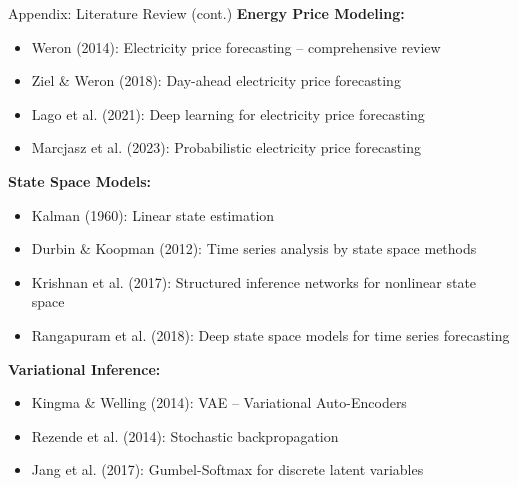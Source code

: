 \documentclass[aspectratio=169]{beamer}
\begin{document}
\begin{frame}{Appendix: Literature Review (cont.)}
\textbf{Energy Price Modeling:}
\begin{itemize}
    \item Weron (2014): Electricity price forecasting -- comprehensive review
    \item Ziel \& Weron (2018): Day-ahead electricity price forecasting
    \item Lago et al. (2021): Deep learning for electricity price forecasting
    \item Marcjasz et al. (2023): Probabilistic electricity price forecasting
\end{itemize}

\vspace{0.3cm}
\textbf{State Space Models:}
\begin{itemize}
    \item Kalman (1960): Linear state estimation
    \item Durbin \& Koopman (2012): Time series analysis by state space methods
    \item Krishnan et al. (2017): Structured inference networks for nonlinear state space
    \item Rangapuram et al. (2018): Deep state space models for time series forecasting
\end{itemize}

\vspace{0.3cm}
\textbf{Variational Inference:}
\begin{itemize}
    \item Kingma \& Welling (2014): VAE -- Variational Auto-Encoders
    \item Rezende et al. (2014): Stochastic backpropagation
    \item Jang et al. (2017): Gumbel-Softmax for discrete latent variables
\end{itemize}
\end{frame}
\end{document}
